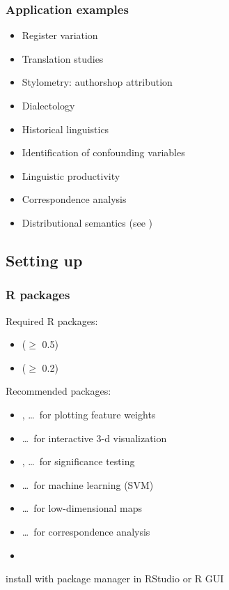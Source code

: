 \documentclass[t]{beamer} %
\begin{document}
\begin{frame}
  \frametitle{Application examples}

  \begin{itemize}
  \item Register variation \citep{Biber:88,Biber:93}
  \item Translation studies\\ \citep{Evert:Neumann:16,DeSutter:Delaere:Plevoets:12}
  \item Stylometry: authorshop attribution \citep{Evert:etc:17}
  \item Dialectology \citep{Speelman:Grondelaers:Geeraerts:03}
  \item Historical linguistics \citep{Sagi:Kaufmann:Clark:09,Perek:18}
  \item Identification of confounding variables \citep{Tummers:Speelman:Geeraerts:14}
  \item Linguistic productivity \citep{Jenset:McGillivray:12}
  \item Correspondence analysis \citep{Greenacre:07}
  \item Distributional semantics (see \href{http://wordspace.collocations.de/doku.php/course:esslli2018:start}{})
  \end{itemize}
\end{frame}

\subsection{Setting up}

\begin{frame}
  \frametitle{R packages}

  Required R packages:
  \begin{itemize}
  \item {} ($\geq$ 0.5)
  \item {} ($\geq$ 0.2)
  \end{itemize}

  Recommended packages:
  \begin{itemize}
  \item {},  \ldots\ for plotting feature weights
  \item {} \ldots\ for interactive 3-d visualization
  \item {},  \ldots\ for significance testing
  \item {} \ldots\ for machine learning (SVM)
  \item {} \ldots\ for low-dimensional maps
  \item {} \ldots\ for correspondence analysis
  \item[]
  \end{itemize}

  \hand{} install with package manager in RStudio or R GUI
\end{frame}
\end{document}

